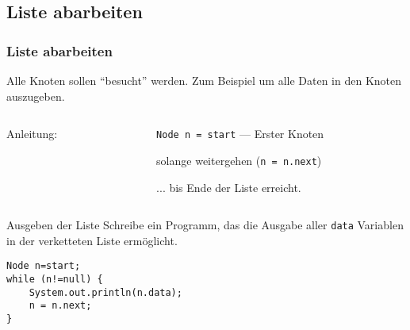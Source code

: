 \begin{multicols}{2}
\begin{frame}[fragile]
\end{frame}


\subsection{Liste abarbeiten}

\begin{frame}[fragile]
\frametitle<presentation>{Liste abarbeiten}

Alle Knoten sollen "`besucht"' werden.
Zum Beispiel um alle Daten in den Knoten auszugeben.

\begin{columns}[c]\begin{column}{0.2 \textwidth}
Anleitung:
\end{column}\begin{column}{0.7 \textwidth}
\begin{compactitem}%
\item \lstinline{Node n = start} --- Erster Knoten
\item solange weitergehen (\lstinline{n = n.next}) 
	\begin{compactitem}
	\item ... bis Ende der Liste erreicht.
	\end{compactitem}
\end{compactitem}
\end{column}\end{columns}

\begin{assignment}{3cm}{Ausgeben der Liste}
Schreibe ein Programm, das die Ausgabe aller \lstinline{data} Variablen in der verketteten Liste ermöglicht.
\end{assignment}
\pause
\begin{vers:beamersolutions}\begin{Loesung}
\pause%
\begin{lstlisting}[emph={}]
Node n=start;
while (n!=null) {
    System.out.println(n.data);
    n = n.next;
}
\end{lstlisting}
\end{Loesung}\end{vers:beamersolutions}



\end{frame}
\end{multicols}
